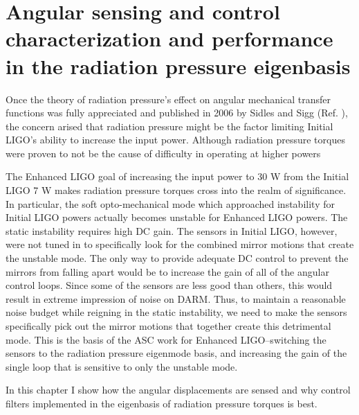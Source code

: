 \chapter{Angular sensing and control characterization and performance in the radiation pressure eigenbasis} 
Once the theory of radiation pressure's effect on angular mechanical
transfer functions was fully appreciated and published in 2006 by
Sidles and Sigg (Ref. \cite{Sidles2006Optical}), the concern arised that radiation
pressure might be the factor limiting Initial LIGO's ability to
increase the input power. Although radiation pressure torques were
proven to not be the cause of difficulty in operating at higher powers
\cite{Hirose2010Angular}





The Enhanced LIGO goal of increasing the input power to 30 W from the
Initial LIGO 7 W makes radiation pressure torques cross into the realm
of significance. In particular, the soft opto-mechanical mode which
approached instability for Initial LIGO powers actually becomes
unstable for Enhanced LIGO powers. The static instability requires
high DC gain. The sensors in Initial LIGO, however, were not tuned in
to specifically look for the combined mirror motions that create the
unstable mode. The only way to provide adequate DC control to prevent
the mirrors from falling apart would be to increase the gain of all of
the angular control loops. Since some of the sensors are less good
than others, this would result in extreme impression of noise on
DARM. Thus, to maintain a reasonable noise budget while reigning in
the static instability, we need to make the sensors specifically pick
out the mirror motions that together create this detrimental
mode. This is the basis of the ASC work for Enhanced LIGO--switching
the sensors to the radiation pressure eigenmode basis, and increasing
the gain of the single loop that is sensitive to only the unstable mode. 

In this chapter I show how the angular displacements are sensed and
why control filters implemented in the eigenbasis of radiation
pressure torques is best. 



